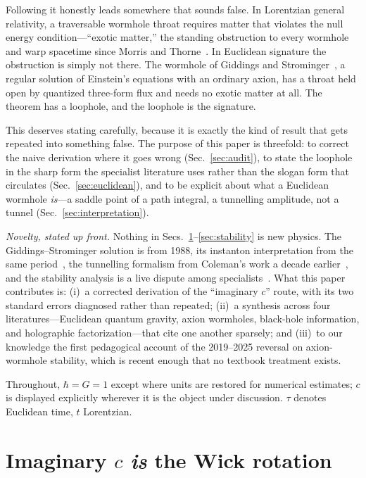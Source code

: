 \documentclass[twocolumn,floatfix,aps,prd,nofootinbib]{revtex4-2}
\begin{document}
Following it honestly leads somewhere that sounds false. In Lorentzian general relativity, a traversable wormhole throat requires matter that violates the null energy condition---``exotic matter,'' the standing obstruction to every wormhole and warp spacetime since Morris and Thorne~\cite{morris_thorne1988,alcubierre1994}. In Euclidean signature the obstruction is simply not there. The wormhole of Giddings and Strominger~\cite{gs1988}, a regular solution of Einstein's equations with an ordinary axion, has a throat held open by quantized three-form flux and needs no exotic matter at all. The theorem has a loophole, and the loophole is the signature.

This deserves stating carefully, because it is exactly the kind of result that gets repeated into something false. The purpose of this paper is threefold: to correct the naive derivation where it goes wrong (Sec.~\ref{sec:audit}), to state the loophole in the sharp form the specialist literature uses rather than the slogan form that circulates (Sec.~\ref{sec:euclidean}), and to be explicit about what a Euclidean wormhole \emph{is}---a saddle point of a path integral, a tunnelling amplitude, not a tunnel (Sec.~\ref{sec:interpretation}).

\emph{Novelty, stated up front.} Nothing in Secs.~\ref{sec:wick}--\ref{sec:stability} is new physics. The Giddings--Strominger solution is from 1988, its instanton interpretation from the same period~\cite{coleman1988,hawking1988}, the tunnelling formalism from Coleman's work a decade earlier~\cite{coleman1977}, and the stability analysis is a live dispute among specialists~\cite{hertog2019,hertog2024,marolf2025}. What this paper contributes is: (i)~a corrected derivation of the ``imaginary $c$'' route, with its two standard errors diagnosed rather than repeated; (ii)~a synthesis across four literatures---Euclidean quantum gravity, axion wormholes, black-hole information, and holographic factorization---that cite one another sparsely; and (iii)~to our knowledge the first pedagogical account of the 2019--2025 reversal on axion-wormhole stability, which is recent enough that no textbook treatment exists.

Throughout, $\hbar=G=1$ except where units are restored for numerical estimates; $c$ is displayed explicitly wherever it is the object under discussion. $\tau$ denotes Euclidean time, $t$ Lorentzian.

\section{Imaginary \texorpdfstring{$c$}{c} \emph{is} the Wick rotation}
\label{sec:wick}
\end{document}
